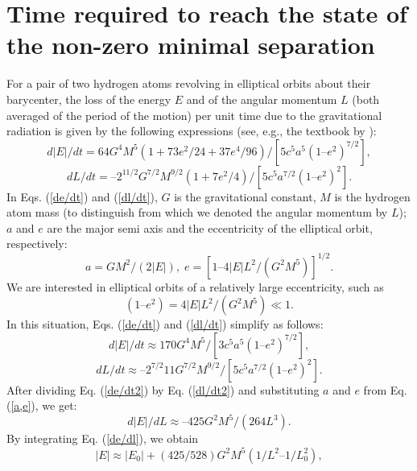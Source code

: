 \documentclass[referee]{raa}            %
\begin{document}
	\section{Time required to reach the state of the non-zero minimal separation}
	   For a pair of two hydrogen atoms revolving in elliptical orbits about their barycenter, the loss of the energy $E$ and of the angular momentum $L$ (both averaged of the period of the motion) per unit time due to the gravitational radiation is given by the following expressions (see, e.g., the textbook by \cite{Landau+Lifshitz+1975}):
	\begin{equation}
		d|E|/dt = 64G^4M^5(1 + 73e^2/24 + 37e^4/96)/[5c^5a^5(1 – e^2)^{7/2}], 
		\label{de/dt}
	\end{equation}
	\begin{equation}
		dL/dt = – 2^{11/2}G^{7/2}M^{9/2}(1 + 7e^2/4)/[5c^5a^{7/2}(1 – e^2)^2].	
		\label{dl/dt}
	\end{equation}
In Eqs. (\ref{de/dt}) and (\ref{dl/dt}), $G$ is the gravitational constant, $M$ is the hydrogen atom mass (to distinguish from which we denoted the angular momentum by $L$); $a$ and $e$ are the major semi axis and the eccentricity of the elliptical orbit, respectively:
	\begin{equation}
		a = GM^2/(2|E|), \;	e = [1 – 4|E|L^2/(G^2M^5)]^{1/2}.
		\label{a,e}
	\end{equation}
We are interested in elliptical orbits of a relatively large eccentricity, such as
	\begin{equation}
		(1 – e^2) = 4|E|L^2/(G^2M^5) \ll 1.
		\label{e2}
	\end{equation}
In this situation, Eqs. (\ref{de/dt}) and  (\ref{dl/dt}) simplify as follows:
	\begin{equation}
		d|E|/dt \approx 170G^4M^5/[3c^5a^5(1 – e^2)^{7/2}], 	
		\label{de/dt2}
	\end{equation}
	\begin{equation}
		dL/dt \approx – 2^{7/2}11G^{7/2}M^{9/2}/[5c^5a^{7/2}(1 – e^2)^2].
		\label{dl/dt2}
	\end{equation}
After dividing Eq. (\ref{de/dt2}) by Eq. (\ref{dl/dt2}) and substituting $a$ and $e$ from Eq. (\ref{a,e}), we get:
	\begin{equation}
		d|E|/dL \approx – 425G^2M^5/(264L^3).
		\label{de/dl}
	\end{equation}
By integrating Eq. (\ref{de/dl}), we obtain
	\begin{equation}
		|E| \approx |E_0| + (425/528)G^2M^5(1/L^2 – 1/L_0^2), 	
		\label{E}
	\end{equation}
\end{document}
